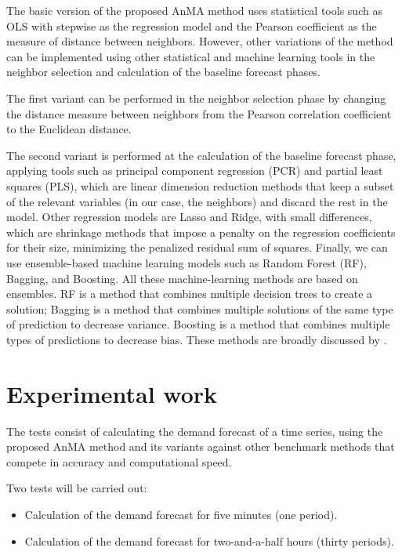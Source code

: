 The basic version of the proposed AnMA method uses statistical tools such as OLS with stepwise as the regression model and the Pearson coefficient as the measure of distance between neighbors. However, other variations of the method can be implemented using other statistical and machine learning tools in the neighbor selection and calculation of the baseline forecast phases.

The first variant can be performed in the neighbor selection phase by changing the distance measure between neighbors from the Pearson correlation coefficient to the Euclidean distance. 

The second variant is performed at the calculation of the baseline forecast phase, applying tools such as principal component regression (PCR) and partial least squares (PLS), which are linear dimension reduction methods that keep a subset of the relevant variables (in our case, the neighbors) and discard the rest in the model. Other regression models are Lasso and Ridge, with small differences, which are shrinkage methods that impose a penalty on the regression coefficients for their size, minimizing the penalized residual sum of squares. Finally, we can use ensemble-based machine learning models such as Random Forest (RF), Bagging, and Boosting. 
All these machine-learning methods are based on ensembles. RF is a method that combines multiple decision trees to create a solution; Bagging is a method that combines multiple solutions of the same type of prediction to decrease variance. Boosting is a method that combines multiple types of predictions to decrease bias.
These methods are broadly discussed by \citet{Hastie2009}.

















\section{Experimental work}
The tests consist of calculating the demand forecast of a time series, using the proposed AnMA method and its variants against other benchmark methods that compete in accuracy and computational speed. 

Two tests will be carried out:
  \begin{itemize}
      \item Calculation of the demand forecast for five minutes (one period).
      \item Calculation of the demand forecast for two-and-a-half hours (thirty periods).
  \end{itemize}
  
